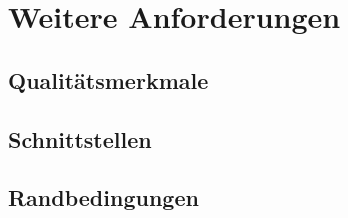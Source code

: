 \documentclass[a4paper]{article}
\let\oldsection\section
\renewcommand\section{\clearpage\oldsection}
\begin{document}
\pagebreak
\section{Weitere Anforderungen}

\subsection{Qualitätsmerkmale}

\subsection{Schnittstellen}

\subsection{Randbedingungen}
\end{document}
